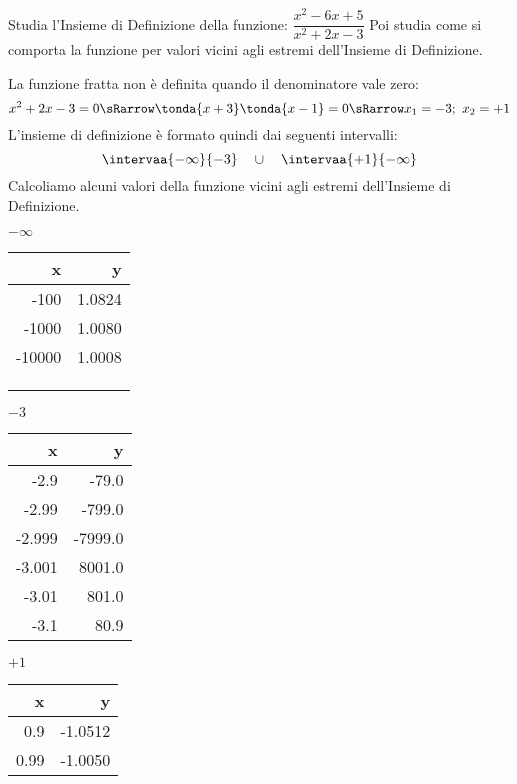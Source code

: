 \begin{esempio}
 Studia l'Insieme di Definizione della funzione: 
 \(\dfrac{x^2-6x+5}{x^2+2x-3}\)
 Poi studia come si comporta la funzione per valori vicini agli estremi 
dell'Insieme di Definizione.

La funzione fratta non è definita quando il denominatore vale zero:
\[x^2+2x-3=0 \sRarrow \tonda{x+3}\tonda{x-1}=0 \sRarrow x_1=-3;~x_2=+1\]
L'insieme di definizione è formato quindi dai seguenti intervalli:
\[\intervaa{-\infty}{-3} \quad \cup \quad \intervaa{+1}{-\infty}\]
Calcoliamo alcuni valori della funzione vicini agli estremi dell'Insieme di 
Definizione.

\begin{minipage}{.24\textwidth}
\begin{center}
\(-\infty\)\\
\begin{tabular}{r|r}
x & y\\\hline
-100 & 1.0824 \\
-1000 & 1.0080 \\
-10000 & 1.0008 \\
&\\
&\\
&
\end{tabular}
\end{center}
\end{minipage}
\begin{minipage}{.24\textwidth}
\begin{center}
\(-3\)\\
\begin{tabular}{r|r}
x & y\\\hline
-2.9 & -79.0 \\
-2.99 & -799.0 \\
-2.999 & -7999.0 \\
-3.001 & 8001.0 \\
-3.01 & 801.0 \\
-3.1 & 80.9 \\
\end{tabular}
\end{center}
\end{minipage}
\begin{minipage}{.24\textwidth}
\begin{center}
\(+1\)\\
\begin{tabular}{r|r}
x & y\\\hline
0.9 & -1.0512\\
0.99 & -1.0050 \\

\end{tabular}
\end{center}
\end{minipage}
\end{esempio}
